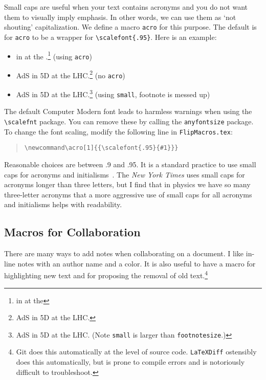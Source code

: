 Small caps are useful when your text contains acronyms and you do not want them to visually imply emphasis. In other words, we can use them as `not shouting' capitalization. We define a macro \texttt{acro} for this purpose. The default is for \texttt{acro} to be a wrapper for 
\verb!\scalefont{.95}!. Here is an example:
\begin{itemize}
	\item {} in  at the .\footnote{ in  at the } (using \texttt{acro})
	\item AdS in 5D at the LHC.\footnote{AdS in 5D at the LHC.} (no \texttt{acro})
	\item {\small{AdS}} in {\small{5D}} at the {\small{LHC}}.\footnote{{\small{AdS}} in {\small{5D}} at the {\small{LHC}}. (Note \texttt{small} is larger than \texttt{footnotesize}.)} (using \texttt{small}, footnote is messed up)
\end{itemize}
The default Computer Modern font leads to harmless warnings when using the \verb!\scalefnt! package. You can remove these by calling the \verb!anyfontsize! package. To change the font scaling, modify the following line in \verb!FlipMacros.tex!:
\begin{quote}
\verb!\newcommand\acro[1]{{\scalefont{.95}{#1}}}!
\end{quote}
Reasonable choices are between .9 and .95. It is a standard practice to use small caps for acronyms and initialisms~\cite{bringhurst2012elements}. The \emph{New York Times} uses small caps for acronyms longer than three letters, but I find that in physics we have so many three-letter acronyms that a more aggressive use of small caps for all acronyms and initialisms helps with readability.


\subsection{Macros for Collaboration}

There are many ways to add notes when collaborating on a document. I like in-line notes with an author name and a color.   It is also useful to have a macro for highlighting new text and for proposing the removal of old text.\footnote{Git does this automatically at the level of source code. \texttt{LaTeXDiff} ostensibly does this automatically, but is prone to compile errors and is notoriously difficult to troubleshoot.}


